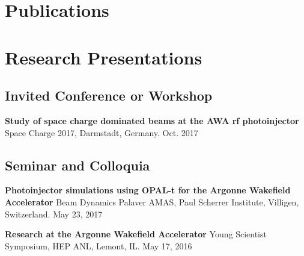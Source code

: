 \documentclass[11pt,a4paper,sans]{moderncv}        %
\begin{document}
\section{Publications}
%




\section{Research Presentations}

\subsection{Invited Conference or Workshop} %
\textbf{Study of space charge dominated beams at the AWA rf photoinjector}\newline
Space Charge 2017, Darmstadt, Germany. Oct. 2017

\subsection{Seminar and Colloquia}
\textbf{Photoinjector simulations using OPAL-t for the Argonne Wakefield Accelerator}\newline
Beam Dynamics Palaver AMAS, Paul Scherrer Institute, Villigen, Switzerland. May 23, 2017 
\vspace{0.3em}

\textbf{Research at the Argonne Wakefield Accelerator}\newline
Young Scientist Symposium, HEP ANL, Lemont, IL. May 17, 2016 
\vspace{0.3em}
\end{document}
